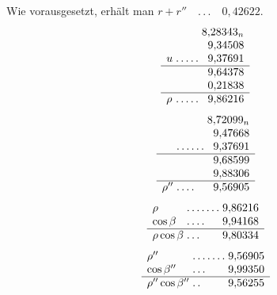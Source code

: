 \noindent Wie vorausgesetzt, erhält man \(r+r''\quad\mathord{.}\,\mathord{.}\,\mathord{.}\quad0{,}42622\).
\[
\begin{array}{l@{\;}l@{\;}r}
&&8{,}28343_n\\
&&9{,}34508\\
u&\mathord{.}\,\mathord{.}\,\mathord{.}\,\mathord{.}\,\mathord{.}&9{,}37691\\\hline
&&9{,}64378\\
&&0{,}21838\\\hline
\rho&\mathord{.}\,\mathord{.}\,\mathord{.}\,\mathord{.}\,\mathord{.}&9{,}86216
\end{array}
\]
\[
\begin{array}{l@{\;}l@{\;}r}
&&8{,}72099_n\\
&&9{,}47668\\
&\mathord{.}\,\mathord{.}\,\mathord{.}\,\mathord{.}\,\mathord{.}\,\mathord{.}&9{,}37691\\\hline
&&9{,}68599\\
&&9{,}88306\\\hline
\rho''&\mathord{.}\,\mathord{.}\,\mathord{.}\,\mathord{.}&9{,}56905
\end{array}
\]
\[
\begin{array}{l@{\;}l@{\;}r}
\rho&\mathord{.}\,\mathord{.}\,\mathord{.}\,\mathord{.}\,\mathord{.}\,\mathord{.}\,\mathord{.}&9{,}86216\\
\cos\beta&\mathord{.}\,\mathord{.}\,\mathord{.}\,\mathord{.}&9{,}94168\\\hline
\rho\cos\beta&\mathord{.}\,\mathord{.}\,\mathord{.}&9{,}80334
\end{array}
\]
\[
\begin{array}{l@{\;}l@{\;}r}
\rho''&\mathord{.}\,\mathord{.}\,\mathord{.}\,\mathord{.}\,\mathord{.}\,\mathord{.}\,\mathord{.}&9{,}56905\\
\cos\beta''&\mathord{.}\,\mathord{.}\,\mathord{.}&9{,}99350\\\hline
\rho''\cos\beta''&\mathord{.}\,\mathord{.}&9{,}56255
\end{array}
\]

